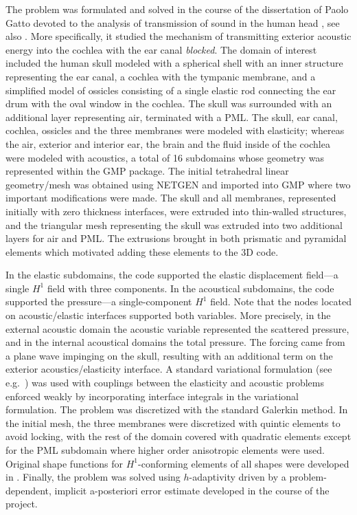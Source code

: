 The problem was formulated and solved in the course of the dissertation of Paolo Gatto devoted to the analysis of transmission of sound in the human head \cite{Gatto2012phd}, see also \cite{Demkowicz_Gatto_etal_11,GattoDemkowicz13}. More specifically, it studied the mechanism of transmitting exterior acoustic energy into the cochlea with the ear canal {\em blocked}. The domain of interest included the human skull modeled with a spherical shell with an inner structure representing the ear canal, a cochlea with the tympanic membrane, and a simplified model of ossicles consisting of a single elastic rod connecting the ear drum with the oval window in the cochlea. The skull was surrounded with an additional layer representing air, terminated with a PML.
The skull, ear canal, cochlea, ossicles and the three membranes were modeled with elasticity; whereas the air, exterior and interior ear, the brain and the fluid inside of the cochlea were modeled with acoustics, a total of 16 subdomains whose geometry was represented within the GMP package. The initial tetrahedral linear geometry/mesh was obtained using NETGEN and imported into GMP where two important modifications were made. The skull and all membranes, represented initially with zero thickness interfaces, were extruded into thin-walled structures, and the triangular mesh representing the skull was extruded into two additional layers for air and PML. The extrusions brought in both prismatic and pyramidal elements which motivated adding these elements to the \hp3D code.

In the elastic subdomains, the code supported the elastic displacement field---a single $H^1$ field with three components. In the acoustical subdomains, the code supported the pressure---a single-component $H^1$ field. Note that the nodes located on acoustic/elastic interfaces supported both variables. More precisely, in the external acoustic domain the acoustic variable represented the scattered pressure, and in the internal acoustical domains the total pressure. The forcing came from a plane wave impinging on the skull, resulting with an additional term on the exterior acoustics/elasticity interface. A standard variational formulation (see e.g.~\cite{hpbook2}) was used with couplings between the elasticity and acoustic problems enforced weakly by incorporating interface integrals in the variational formulation. 
The problem was discretized with the standard Galerkin method. In the initial mesh, the three membranes were discretized with quintic elements to avoid locking, with the rest of the domain covered with quadratic elements except for the PML subdomain where higher order anisotropic elements were used. Original shape functions for $H^1$-conforming elements of all shapes were developed in \cite{GattoDemkowicz10}. Finally, the problem was solved using $h$-adaptivity driven by a problem-dependent, implicit a-posteriori error estimate developed in the course of the project.

